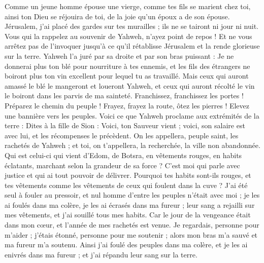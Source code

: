 \begin{multicols}{2}
Comme un jeune homme épouse une vierge, comme tes fils se marient chez toi, ainsi ton Dieu se réjouira de toi, de la joie qu'un époux a de son épouse.
Jérusalem, j'ai placé des gardes sur tes murailles ; ils ne se tairont ni jour ni nuit. Vous qui la rappelez au souvenir de Yahweh, n'ayez point de repos !
Et ne vous arrêtez pas de l'invoquer jusqu'à ce qu'il rétablisse Jérusalem et la rende glorieuse sur la terre.
Yahweh l'a juré par sa droite et par son bras puissant : Je ne donnerai plus ton blé pour nourriture à tes ennemis, et les fils des étrangers ne boiront plus ton vin excellent pour lequel tu as travaillé.
Mais ceux qui auront amassé le blé le mangeront et loueront Yahweh, et ceux qui auront récolté le vin le boiront dans les parvis de ma sainteté.
Franchissez, franchissez les portes ! Préparez le chemin du peuple ! Frayez, frayez la route, ôtez les pierres ! Elevez une bannière vers les peuples.
Voici ce que Yahweh proclame aux extrémités de la terre : Dites à la fille de Sion : Voici, ton Sauveur vient ; voici, son salaire est avec lui, et les récompenses le précèdent.
On les appellera, peuple saint, les rachetés de Yahweh ; et toi, on t'appellera, la recherchée, la ville non abandonnée.
\VerseOne{}Qui est celui-ci qui vient d'Edom, de Botsra, en vêtements rouges, en habits éclatants, marchant selon la grandeur de sa force ? C'est moi qui parle avec justice et qui ai tout pouvoir de délivrer.
Pourquoi tes habits sont-ils rouges, et tes vêtements comme les vêtements de ceux qui foulent dans la cuve ?
J'ai été seul à fouler au pressoir, et nul homme d'entre les peuples n'était avec moi ; je les ai foulés dans ma colère, je les ai écrasés dans ma fureur ; leur sang a rejailli sur mes vêtements, et j'ai souillé tous mes habits.
Car le jour de la vengeance était dans mon cœur, et l'année de mes rachetés est venue.
Je regardais, personne pour m'aider ; j'étais étonné, personne pour me soutenir ; alors mon bras m'a sauvé et ma fureur m'a soutenu.
Ainsi j'ai foulé des peuples dans ma colère, et je les ai enivrés dans ma fureur ; et j'ai répandu leur sang sur la terre.

\end{multicols}
